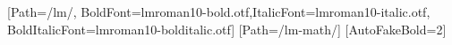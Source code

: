\usepackage{fontspec,xeCJK,unicode-math}
\setmainfont{lmroman10-regular.otf}[Path=\FontRoot/lm/,
  BoldFont=lmroman10-bold.otf,ItalicFont=lmroman10-italic.otf,
  BoldItalicFont=lmroman10-bolditalic.otf]
[Path=\FontRoot/lm-math/]
[AutoFakeBold=2]
\usepackage{amsmath,xcolor,enumitem}
\setlength{\parindent}{0pt}
\setlength{\parskip}{6pt}
\setlength{\emergencystretch}{1.2em}
\linespread{1.17}
\newcommand{\R}{\mathbb R}
\newcommand{\N}{\mathbb N}
\newcommand{\Q}{\mathbb Q}
\newcommand{\B}{\mathcal B}
\newcommand{\T}{\mathcal T}
\newcommand{\M}{\mathcal M}
\newcommand{\dd}{\,\mathrm d}
\newcommand{\dep}[1]{\par{\small\color{muted}〔依据：#1〕}\par}
